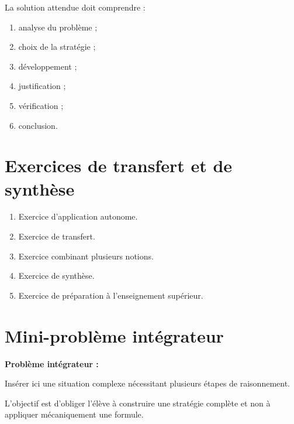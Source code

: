 \documentclass[11pt,a4paper]{article}
\begin{document}
\begin{cadresolution}
La solution attendue doit comprendre :
\begin{enumerate}
    \item analyse du problème ;
    \item choix de la stratégie ;
    \item développement ;
    \item justification ;
    \item vérification ;
    \item conclusion.
\end{enumerate}
\end{cadresolution}

\section{Exercices de transfert et de synthèse}

\begin{cadreactivite}
\begin{enumerate}
    \item Exercice d’application autonome.
    \item Exercice de transfert.
    \item Exercice combinant plusieurs notions.
    \item Exercice de synthèse.
    \item Exercice de préparation à l’enseignement supérieur.
\end{enumerate}
\end{cadreactivite}

\section{Mini-problème intégrateur}

\begin{cadreenonce}
\textbf{Problème intégrateur :}

Insérer ici une situation complexe nécessitant plusieurs étapes de raisonnement.

\medskip

L’objectif est d’obliger l’élève à construire une stratégie complète et non à appliquer mécaniquement une formule.
\end{cadreenonce}
\end{document}
